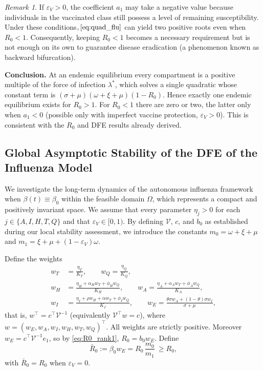 \documentclass[12pt,a4paper]{article}
\theoremstyle{definition}
\theoremstyle{remark}
\newtheorem{remark}[theorem]{Remark}
\begin{document}
\begin{remark}
If $\varepsilon_V>0$, the coefficient $a_1$ may take a negative value because individuals in the vaccinated class still possess a level of remaining susceptibility. Under these conditions$, \eqref{eq:quad_flu}$ can yield two positive roots even when $R_0<1$. Consequently, keeping $R_0<1$ becomes a necessary requirement but is not enough on its own to guarantee disease eradication (a phenomenon known as backward bifurcation).
\end{remark}

\textbf{Conclusion.} At an endemic equilibrium every compartment is a positive
multiple of the force of infection $\lambda^*$, which solves a single quadratic
whose constant term is $(\sigma+\mu)(\omega+\xi+\mu)(1-R_0)$. Hence exactly one
endemic equilibrium exists for $R_0>1$. For $R_0<1$ there are zero or two, the
latter only when $a_1<0$ (possible only with imperfect vaccine protection,
$\varepsilon_V>0$). This is consistent with the $R_0$ and DFE results already
derived.




\subsection{Global Asymptotic Stability of the DFE of the Influenza Model}
\label{GAS_flu}


We investigate the long-term dynamics of the autonomous influenza framework when $\beta(t)\equiv\beta_0$ within the feasible domain $\Omega$, which represents a compact and positively invariant space. We assume that every parameter $\eta_j>0$ for each $j\in\{A,I,H,T,Q\}$ and that $\varepsilon_V\in[0,1)$. By defining $\mathcal V$, $c$, and $b_0$ as established during our local stability assessment, we introduce the constants $m_0=\omega+\xi+\mu$ and $m_1=\xi+\mu+(1-\varepsilon_V)\omega$.


Define the weights
\begin{equation}\label{eq:weights}
\begin{aligned}
w_T&=\frac{\eta_T}{K_T},\qquad w_Q=\frac{\eta_Q}{K_Q},\\
w_H&=\frac{\eta_H+\alpha_Hw_T+\phi_Hw_Q}{K_H},\qquad
w_A=\frac{\eta_A+\alpha_Aw_T+\phi_Aw_Q}{K_A},\\
w_I&=\frac{\eta_I+\rho w_H+\alpha w_T+\phi_Iw_Q}{K_I},\qquad
w_E=\frac{\theta\sigma w_A+(1-\theta)\sigma w_I}{\sigma+\mu},
\end{aligned}
\end{equation}
that is, $w^\top=c^\top\mathcal V^{-1}$ (equivalently $\mathcal V^\top w=c$), where
$w=(w_E,w_A,w_I,w_H,w_T,w_Q)^\top$. All weights are strictly positive. Moreover
$w_E=c^\top\mathcal V^{-1}e_1$, so by \eqref{eq:R0_rank1}, $R_0=b_0w_E$. Define
\begin{equation}\label{eq:R0bar}
\bar R_0:=\beta_0w_E=R_0\,\frac{m_0}{m_1}\ \ge R_0,
\end{equation}
with $\bar R_0=R_0$ when $\varepsilon_V=0$.
\end{document}
